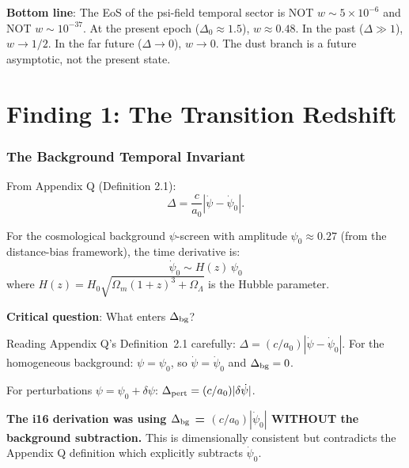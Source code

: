 \documentclass[11pt]{article}
\newcommand{\ee}[1]{\times 10^{#1}}
\begin{document}
\begin{tcolorbox}[colback=red!5!white, colframe=red!70!black,
  title=\textbf{W4i17 TOP 5 FINDINGS --- EXISTENTIAL AUDIT: DUST BRANCH CLUSTERING}]
\begin{enumerate}
  \textbf{Bottom line}: The EoS of the psi-field temporal sector
  is NOT $w \sim 5\ee{-6}$ and NOT $w \sim 10^{-37}$. At the
  present epoch ($\Delta_0 \approx 1.5$), $w \approx 0.48$. In the
  past ($\Delta \gg 1$), $w \to 1/2$. In the far future
  ($\Delta \to 0$), $w \to 0$. The dust branch is a future
  asymptotic, not the present state.

\end{enumerate}
\end{tcolorbox}


\part{Finding 1: The Transition Redshift}
\label{part:zcross}

\section{The Background Temporal Invariant}

From Appendix Q (Definition 2.1):
\begin{equation}
\Delta = \frac{c}{a_0}|\dot\psi - \dot\psi_0|.
\end{equation}

For the cosmological background $\psi$-screen with amplitude $\psi_0 \approx 0.27$
(from the distance-bias framework), the time derivative is:
\begin{equation}
\dot\psi_0 \sim H(z)\,\psi_0
\end{equation}
where $H(z) = H_0\sqrt{\Omega_m(1+z)^3 + \Omega_\Lambda}$ is the Hubble parameter.

\textbf{Critical question}: What enters $\Delta_{\rm bg}$?

Reading Appendix Q's Definition~2.1 carefully: $\Delta = (c/a_0)|\dot\psi - \dot\psi_0|$.
For the homogeneous background: $\psi = \psi_0$, so $\dot\psi = \dot\psi_0$ and
$\Delta_{\rm bg} = 0$.

For perturbations $\psi = \psi_0 + \delta\psi$:
$\Delta_{\rm pert} = (c/a_0)|\delta\dot\psi|$.

\textbf{The i16 derivation was using $\Delta_{\rm bg}$
= $(c/a_0)|\dot\psi_0|$ WITHOUT the background subtraction.}
This is dimensionally consistent but contradicts the Appendix Q definition
which explicitly subtracts $\dot\psi_0$.
\end{document}
